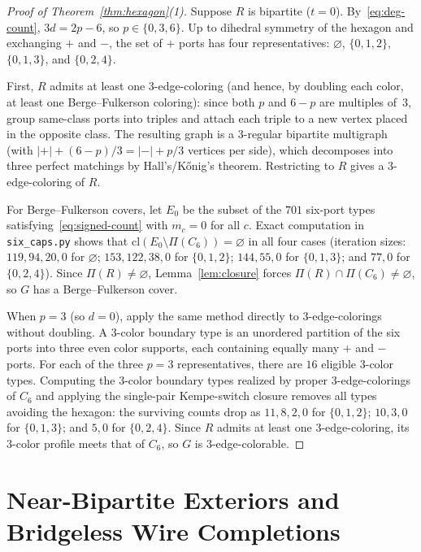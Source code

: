 \documentclass[11pt]{article}
\begin{document}
\begin{proof}[Proof of Theorem~\ref{thm:hexagon}(1)]
Suppose $R$ is bipartite ($t = 0$). By~\eqref{eq:deg-count}, $3d = 2p - 6$, so
$p \in \{0, 3, 6\}$. Up to dihedral symmetry of the hexagon and exchanging $+$ and $-$,
the set of $+$ ports has four representatives: $\varnothing$, $\{0,1,2\}$, $\{0,1,3\}$,
and $\{0,2,4\}$.

First, $R$ admits at least one $3$-edge-coloring (and hence, by doubling each color, at
least one Berge--Fulkerson coloring): since both $p$ and $6 - p$ are multiples of~$3$,
group same-class ports into triples and attach each triple to a new vertex placed in the
opposite class. The resulting graph is a $3$-regular bipartite multigraph (with
$|+| + (6-p)/3 = |-| + p/3$ vertices per side), which decomposes into three perfect
matchings by Hall's/K\H{o}nig's theorem. Restricting to $R$ gives a $3$-edge-coloring of
$R$.

For Berge--Fulkerson covers, let $E_0$ be the subset of the $701$ six-port types
satisfying~\eqref{eq:signed-count} with $m_c = 0$ for all $c$. Exact computation in
\texttt{six\_caps.py} shows that $\mathrm{cl}(E_0 \setminus \Pi(C_6)) = \varnothing$ in
all four cases (iteration sizes: $119, 94, 20, 0$ for $\varnothing$; $153, 122, 38, 0$ for
$\{0,1,2\}$; $144, 55, 0$ for $\{0,1,3\}$; and $77, 0$ for $\{0,2,4\}$). Since
$\Pi(R) \neq \varnothing$, Lemma~\ref{lem:closure} forces
$\Pi(R) \cap \Pi(C_6) \neq \varnothing$, so $G$ has a Berge--Fulkerson cover.

When $p = 3$ (so $d = 0$), apply the same method directly to $3$-edge-colorings without
doubling. A $3$-color boundary type is an unordered partition of the six ports into three
even color supports, each containing equally many $+$ and $-$ ports. For each of the
three $p = 3$ representatives, there are $16$ eligible $3$-color types. Computing the
$3$-color boundary types realized by proper $3$-edge-colorings of $C_6$ and applying the
single-pair Kempe-switch closure removes all types avoiding the hexagon: the surviving
counts drop as $11, 8, 2, 0$ for $\{0,1,2\}$; $10, 3, 0$ for $\{0,1,3\}$; and $5, 0$ for
$\{0,2,4\}$. Since $R$ admits at least one $3$-edge-coloring, its $3$-color profile meets
that of $C_6$, so $G$ is $3$-edge-colorable.
\end{proof}

\section{Near-Bipartite Exteriors and Bridgeless Wire Completions}
\end{document}
